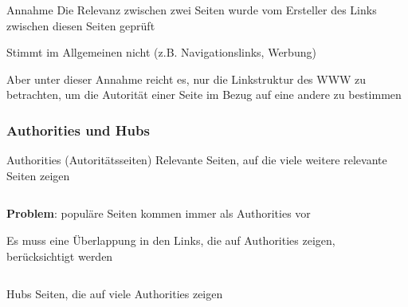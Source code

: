\documentclass[hyperref={pdfpagelabels=false}]{beamer}
\begin{document}
\begin{frame}[allowframebreaks]

\begin{block}{Annahme}
Die Relevanz zwischen zwei Seiten wurde vom Ersteller des Links zwischen diesen Seiten geprüft
\end{block}

Stimmt im Allgemeinen nicht (z.B. Navigationslinks, Werbung)
\vspace{10pt}

Aber unter dieser Annahme reicht es, nur die Linkstruktur des WWW zu betrachten, um die Autorität einer Seite im Bezug auf eine andere zu bestimmen

\frametitle{Authorities und Hubs}

\framebreak

\begin{block}{Authorities (Autoritätsseiten)}
Relevante Seiten, auf die viele weitere relevante Seiten zeigen
\end{block}

\vspace{5pt}
\begin{minipage}[0.2\textheight]{\textwidth}
	\begin{columns}[T]
		\begin{column}{0.7\textwidth}
			{\bf Problem}: populäre Seiten kommen immer als Authorities vor
			
			\vspace{10pt}
			Es muss eine Überlappung in den Links, die auf Authorities zeigen, berücksichtigt werden
		\end{column}
		\begin{column}{0.2\textwidth}
			\begin{figure}
			\end{figure}
		\end{column}
	\end{columns}
\end{minipage}

\begin{block}{Hubs}
Seiten, die auf viele Authorities zeigen
\end{block}

\end{frame}
\end{document}
